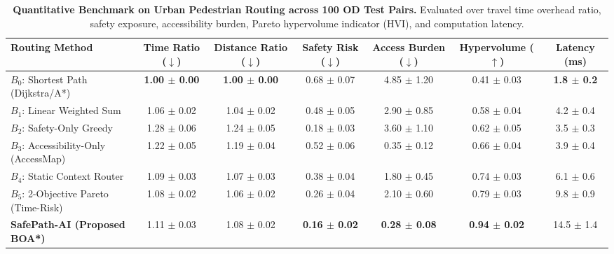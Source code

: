 \begin{table}[t]
\centering
\small
\caption{\textbf{Quantitative Benchmark on Urban Pedestrian Routing across 100 OD Test Pairs.} Evaluated over travel time overhead ratio, safety exposure, accessibility burden, Pareto hypervolume indicator (HVI), and computation latency.}
\label{tab:baselines}
\begin{tabular}{lcccccc}
\toprule
\textbf{Routing Method} & \textbf{Time Ratio ($\downarrow$)} & \textbf{Distance Ratio ($\downarrow$)} & \textbf{Safety Risk ($\downarrow$)} & \textbf{Access Burden ($\downarrow$)} & \textbf{Hypervolume ($\uparrow$)} & \textbf{Latency (ms)} \\
\midrule
$B_0$: Shortest Path (Dijkstra/A*) & \textbf{1.00 $\pm$ 0.00} & \textbf{1.00 $\pm$ 0.00} & 0.68 $\pm$ 0.07 & 4.85 $\pm$ 1.20 & 0.41 $\pm$ 0.03 & \textbf{1.8 $\pm$ 0.2} \\
$B_1$: Linear Weighted Sum & 1.06 $\pm$ 0.02 & 1.04 $\pm$ 0.02 & 0.48 $\pm$ 0.05 & 2.90 $\pm$ 0.85 & 0.58 $\pm$ 0.04 & 4.2 $\pm$ 0.4 \\
$B_2$: Safety-Only Greedy & 1.28 $\pm$ 0.06 & 1.24 $\pm$ 0.05 & 0.18 $\pm$ 0.03 & 3.60 $\pm$ 1.10 & 0.62 $\pm$ 0.05 & 3.5 $\pm$ 0.3 \\
$B_3$: Accessibility-Only (AccessMap) & 1.22 $\pm$ 0.05 & 1.19 $\pm$ 0.04 & 0.52 $\pm$ 0.06 & 0.35 $\pm$ 0.12 & 0.66 $\pm$ 0.04 & 3.9 $\pm$ 0.4 \\
$B_4$: Static Context Router & 1.09 $\pm$ 0.03 & 1.07 $\pm$ 0.03 & 0.38 $\pm$ 0.04 & 1.80 $\pm$ 0.45 & 0.74 $\pm$ 0.03 & 6.1 $\pm$ 0.6 \\
$B_5$: 2-Objective Pareto (Time-Risk) & 1.08 $\pm$ 0.02 & 1.06 $\pm$ 0.02 & 0.26 $\pm$ 0.04 & 2.10 $\pm$ 0.60 & 0.79 $\pm$ 0.03 & 9.8 $\pm$ 0.9 \\
\midrule
\textbf{SafePath-AI (Proposed BOA*)} & 1.11 $\pm$ 0.03 & 1.08 $\pm$ 0.02 & \textbf{0.16 $\pm$ 0.02} & \textbf{0.28 $\pm$ 0.08} & \textbf{0.94 $\pm$ 0.02} & 14.5 $\pm$ 1.4 \\
\bottomrule
\end{tabular}
\end{table}
